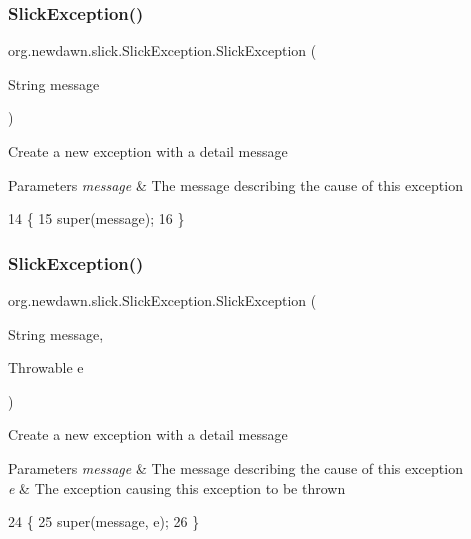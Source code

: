 \subsubsection{\texorpdfstring{Slick\+Exception()}{SlickException()}\hspace{0.1cm}{\footnotesize\ttfamily [1/2]}}
{\footnotesize\ttfamily org.\+newdawn.\+slick.\+Slick\+Exception.\+Slick\+Exception (\begin{DoxyParamCaption}\item[{String}]{message }\end{DoxyParamCaption})\hspace{0.3cm}{\ttfamily [inline]}}

Create a new exception with a detail message


\begin{DoxyParams}{Parameters}
{\em message} & The message describing the cause of this exception \\
\hline
\end{DoxyParams}

\begin{DoxyCode}
14                                           \{
15         super(message);
16     \}
\end{DoxyCode}
\mbox{\label{classorg_1_1newdawn_1_1slick_1_1_slick_exception_a4e4874e61391121a888a6770b4779c7e}} 
\subsubsection{\texorpdfstring{Slick\+Exception()}{SlickException()}\hspace{0.1cm}{\footnotesize\ttfamily [2/2]}}
{\footnotesize\ttfamily org.\+newdawn.\+slick.\+Slick\+Exception.\+Slick\+Exception (\begin{DoxyParamCaption}\item[{String}]{message,  }\item[{Throwable}]{e }\end{DoxyParamCaption})\hspace{0.3cm}{\ttfamily [inline]}}

Create a new exception with a detail message


\begin{DoxyParams}{Parameters}
{\em message} & The message describing the cause of this exception \\
\hline
{\em e} & The exception causing this exception to be thrown \\
\hline
\end{DoxyParams}

\begin{DoxyCode}
24                                                        \{
25         super(message, e);
26     \}
\end{DoxyCode}
